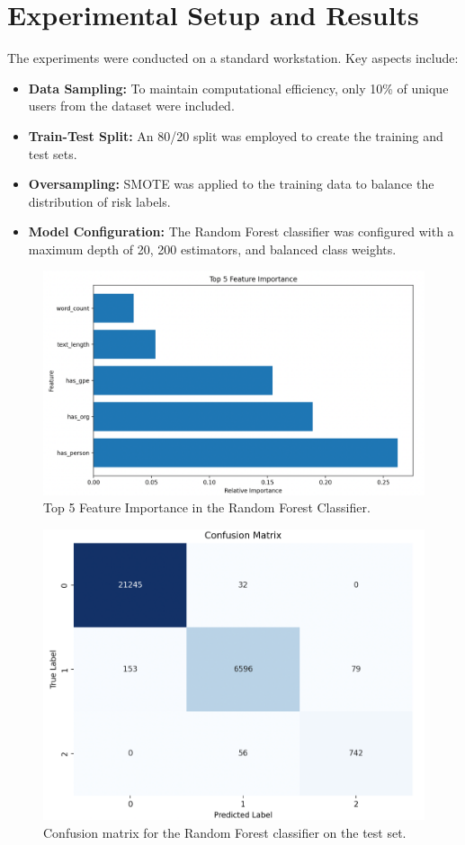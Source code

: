 \documentclass{article}
\begin{document}
\section{Experimental Setup and Results}
The experiments were conducted on a standard workstation. Key aspects include:
\begin{itemize}
    \item \textbf{Data Sampling:} To maintain computational efficiency, only 10\% of unique users from the dataset were included.
    \item \textbf{Train-Test Split:} An 80/20 split was employed to create the training and test sets.
    \item \textbf{Oversampling:} SMOTE was applied to the training data to balance the distribution of risk labels.
    \item \textbf{Model Configuration:} The Random Forest classifier was configured with a maximum depth of 20, 200 estimators, and balanced class weights.
\end{itemize}

\begin{figure}[ht]
    \centering
    \includegraphics[width=0.6\linewidth]{fi.png}
    \caption{Top 5 Feature Importance in the Random Forest Classifier.}
    \label{fig:feature_importance}
\end{figure}

\begin{figure}[ht]
    \centering
    \includegraphics[width=0.6\linewidth]{cm.png}
    \caption{Confusion matrix for the Random Forest classifier on the test set.}
    \label{fig:confusion}
\end{figure}
\end{document}
